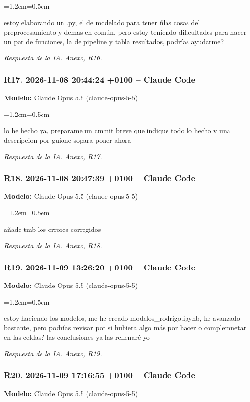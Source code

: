\documentclass[11pt,a4paper]{article}
\newenvironment{prompt}
  {\par\smallskip\begin{list}{}{\leftmargin=1.2em\rightmargin=0.5em}\item\relax\small\color{black!80}}
  {\end{list}\smallskip}
\begin{document}
\begin{prompt}
estoy elaborando un .py, el de modelado para tener ñlas cosas del preprocesamiento y demas en común, pero estoy teniendo dificultades para hacer un par de funciones, la de pipeline y tabla resultados, podrías ayudarme?
\end{prompt}

\textit{Respuesta de la IA: Anexo, R16.}

\subsubsection*{R17. 2026-11-08 20:44:24 +0100 -- Claude Code}
\textbf{Modelo:} Claude Opus 5.5 (claude-opus-5-5)

\begin{prompt}
lo he hecho ya, preparame un cmmit breve que indique todo lo hecho y una descripcion por guione sopara poner ahora
\end{prompt}

\textit{Respuesta de la IA: Anexo, R17.}

\subsubsection*{R18. 2026-11-08 20:47:39 +0100 -- Claude Code}
\textbf{Modelo:} Claude Opus 5.5 (claude-opus-5-5)

\begin{prompt}
añade tmb los errores corregidos
\end{prompt}

\textit{Respuesta de la IA: Anexo, R18.}

\subsubsection*{R19. 2026-11-09 13:26:20 +0100 -- Claude Code}
\textbf{Modelo:} Claude Opus 5.5 (claude-opus-5-5)

\begin{prompt}
estoy haciendo los modelos, me he creado modelos\_\allowbreak{}rodrigo.ipynb, he avanzado bastante, pero podrías revisar por si hubiera  algo más por hacer o complemnetar en las celdas? las conclusiones ya las rellenaré yo
\end{prompt}

\textit{Respuesta de la IA: Anexo, R19.}

\subsubsection*{R20. 2026-11-09 17:16:55 +0100 -- Claude Code}
\textbf{Modelo:} Claude Opus 5.5 (claude-opus-5-5)
\end{document}
